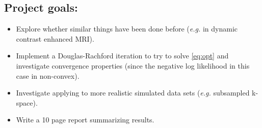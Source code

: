 \documentclass{article}
\begin{document}
\subsection{Project goals:}
\begin{itemize}
\item Explore whether similar things have been done before (\emph{e.g.} in dynamic contrast enhanced MRI). 
\item Implement a Douglas-Rachford iteration to try to solve \eqref{eq:opt} and investigate convergence properties (since the negative log likelihood in this case in non-convex). 
\item Investigate applying to more realistic simulated data sets (\emph{e.g.} subsampled k-space). 
\item Write a 10 page report summarizing results. 
\end{itemize} 



\end{document}
